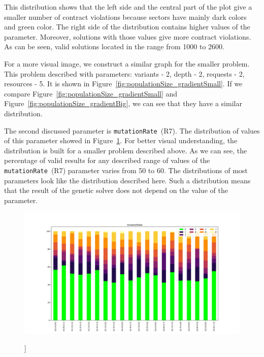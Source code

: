 This distribution shows that the left side and the central part of the plot give a smaller number of contract violations because sectors have mainly dark colors and green color. The right side of the distribution contains higher values of the parameter. Moreover, solutions with those values give more contract violations. As can be seen, valid solutions located in the range from 1000 to 2600.

For a more visual image, we construct a similar graph for the smaller problem. This problem described with parameters: variants - 2, depth - 2, requests - 2, resources - 5.
It is shown in Figure~\ref{fig:populationSize_gradientSmall}. If we compare Figure~\ref{fig:populationSize_gradientSmall} and Figure~\ref{fig:populationSize_gradientBig}, we can see that they have a similar distribution.

The second  discussed parameter is \texttt{mutationRate}~(R7). The distribution of values of this parameter showed in Figure~\ref{fig:mutationRate_gradient}. For better visual understanding, the distribution is built for a smaller problem described above. 
As we can see, the percentage of valid results for any described range of values of the \texttt{mutationRate}~(R7) parameter varies from 50 to 60. The distributions of most parameters look like the distribution described here. Such a distribution means that the result of the genetic solver does not depend on the value of the parameter. 

\begin{figure}
	\centering
	\includegraphics[width=\textwidth]{images/mutationRate_gradient_500dpi.png}
	\caption[]]{}
	\label{fig:mutationRate_gradient}
\end{figure}


